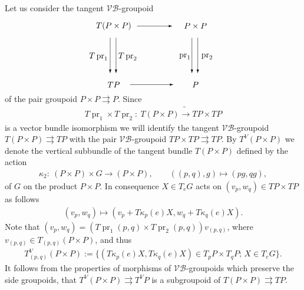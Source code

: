 \documentclass[pdftex]{sigma}
\renewcommand{\to}{\rightarrow}
\newcommand{\tto}{\rightrightarrows}
\numberwithin{equation}{section}
\begin{document}
 Let us consider the tangent $\mathcal{V}\!\mathcal{B}$-groupoid
\begin{gather*}%
\begin{split}& \unitlength=5mm \begin{picture}(11,5.6)(-1.5,0)
 \put(1,5){\makebox(0,0){$T(P\times P)$}}
 \put(8,5){\makebox(0,0){$P\times P$}}
 \put(1,0){\makebox(0,0){$TP$}}
 \put(8,0){\makebox(0,0){$P$}}
 \put(1.2,4){\vector(0,-1){3}}
 \put(0.7,4){\vector(0,-1){3}}
 \put(8.2,4){\vector(0,-1){3}}
 \put(7.7,4){\vector(0,-1){3}}
 \put(3,5){\vector(1,0){3}}
 \put(2.4,0){\vector(1,0){3.7}}
 \put(2.2,2.4){\makebox(0,0){$T\operatorname{pr}_2$}}
 \put(9,2.4){\makebox(0,0){$\operatorname{pr}_2$}}
 \put(-0.3,2.4){\makebox(0,0){$T\operatorname{pr}_1$}}
 \put(7.1,2.4){\makebox(0,0){$\operatorname{pr}_1$}}
 \put(4.5,5.5){\makebox(0,0){$\ $}}
 \put(4.5,0.5){\makebox(0,0){$\ $}}
 \end{picture}\end{split}\end{gather*}
 of the pair groupoid $P\times P\tto P$. Since
 \begin{gather*} T\operatorname{pr}_1\times T\operatorname{pr}_2\colon \ T(P\times P)\tilde\to TP\times TP \end{gather*}
is a vector bundle isomorphism we will identify the tangent $\mathcal{V}\!\mathcal{B}$-groupoid $T(P\times P)\tto TP$ with the pair $\mathcal{V}\!\mathcal{B}$-groupoid $TP\times TP\tto TP$. By $T^V(P\times P)$ we denote the vertical subbundle of the tangent bundle $T(P\times P)$ def\/ined by the action
\begin{gather}\label{actionG}
\kappa_2\colon \ (P\times P)\times G\to(P\times P),\qquad ((p,q),g)\mapsto (pg,qg),
\end{gather}
of $G$ on the product $P\times P$. In consequence $X\in T_eG $ acts on $(v_p, w_q)\in TP\times TP$ as follows
\begin{gather*}
(v_p,w_q)\mapsto(v_p+T\kappa_p(e)X, w_q+T\kappa_q(e)X).
\end{gather*}
Note that $(v_p,w_q)=(T\operatorname{pr}_1(p,q)\times T\operatorname{pr}_2(p,q))v_{(p,q)}$, where $v_{(p,q)}\in T_{(p,q)}(P\times P)$, and thus
\begin{gather*}
T_{(p,q)}^V(P\times P):=\{(T\kappa_p(e)X,T\kappa_q(e)X)\in T_pP\times T_qP;\, X\in T_eG\}.
\end{gather*}
It follows from the properties of morphisms of $\mathcal{V}\!\mathcal{B}$-groupoids which preserve the side groupoids, that $T^V(P\times P)\tto T^VP$ is a subgroupoid of $T(P\times P)\tto TP$.
\end{document}
